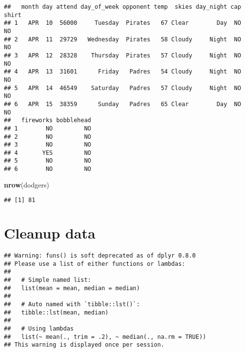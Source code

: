 \documentclass[
]{article}
\newenvironment{Shaded}{\begin{snugshade}}{\end{snugshade}}
\newcommand{\KeywordTok}[1]{\textcolor[rgb]{0.13,0.29,0.53}{\textbf{#1}}}
\newcommand{\NormalTok}[1]{#1}
\newcommand{\OperatorTok}[1]{\textcolor[rgb]{0.81,0.36,0.00}{\textbf{#1}}}
\newcommand{\StringTok}[1]{\textcolor[rgb]{0.31,0.60,0.02}{#1}}
\begin{document}
\begin{verbatim}
##   month day attend day_of_week opponent temp  skies day_night cap shirt
## 1   APR  10  56000     Tuesday  Pirates   67 Clear        Day  NO    NO
## 2   APR  11  29729   Wednesday  Pirates   58 Cloudy     Night  NO    NO
## 3   APR  12  28328    Thursday  Pirates   57 Cloudy     Night  NO    NO
## 4   APR  13  31601      Friday   Padres   54 Cloudy     Night  NO    NO
## 5   APR  14  46549    Saturday   Padres   57 Cloudy     Night  NO    NO
## 6   APR  15  38359      Sunday   Padres   65 Clear        Day  NO    NO
##   fireworks bobblehead
## 1        NO         NO
## 2        NO         NO
## 3        NO         NO
## 4       YES         NO
## 5        NO         NO
## 6        NO         NO
\end{verbatim}

\begin{Shaded}
\begin{Highlighting}[]
\KeywordTok{nrow}\NormalTok{(dodgers)}
\end{Highlighting}
\end{Shaded}

\begin{verbatim}
## [1] 81
\end{verbatim}

\hypertarget{cleanup-data}{%
\section{Cleanup data}\label{cleanup-data}}

\begin{Shaded}
\end{Shaded}

\begin{verbatim}
## Warning: funs() is soft deprecated as of dplyr 0.8.0
## Please use a list of either functions or lambdas: 
## 
##   # Simple named list: 
##   list(mean = mean, median = median)
## 
##   # Auto named with `tibble::lst()`: 
##   tibble::lst(mean, median)
## 
##   # Using lambdas
##   list(~ mean(., trim = .2), ~ median(., na.rm = TRUE))
## This warning is displayed once per session.
\end{verbatim}
\end{document}
